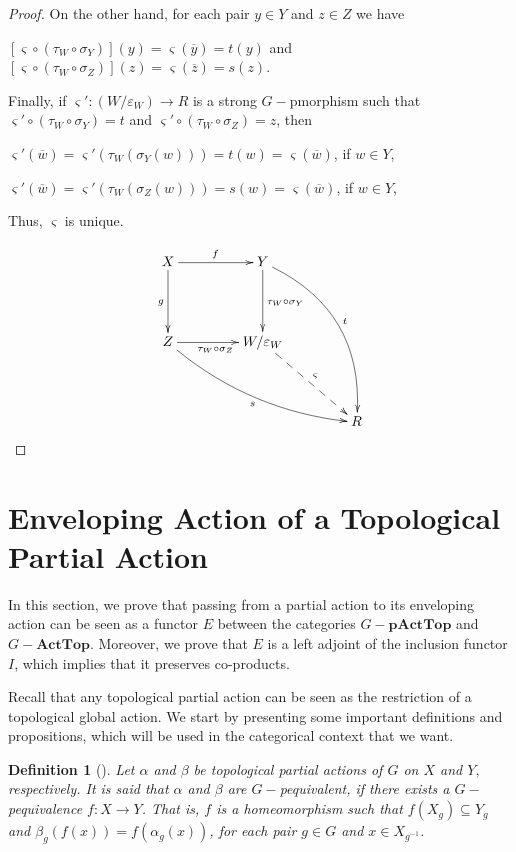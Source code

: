 \documentclass[sn-mathphys-num]{sn-jnl}%
\theoremstyle{thmstyleone}%
\theoremstyle{thmstyletwo}%
\theoremstyle{thmstylethree}%
\newtheorem{definition}{Definition}%
\begin{document}
\begin{proof}
On the other hand, for each pair $ y \in Y $ and $ z \in Z $ we have
\begin{center}
$[\varsigma\circ(\tau_W\circ \sigma_Y)](y)=\varsigma(\overline{y})=t(y)$ and $[\varsigma\circ(\tau_W\circ \sigma_Z)](z)=\varsigma(\overline{z})=s(z)$.
\end{center}
Finally, if $ \varsigma ':( W / \varepsilon_W) \to R $ is a strong $G-$pmorphism such that $\varsigma'\circ(\tau_W\circ \sigma_Y)=t$ and $\varsigma'\circ(\tau_W\circ \sigma_Z)=z$, then
\begin{center}
$\varsigma'(\overline{w})=\varsigma'(\tau_W(\sigma_Y(w)))=t(w)=\varsigma(\overline{w})$, if $w\in Y$,
\end{center}
\begin{center}
$\varsigma'(\overline{w})=\varsigma'(\tau_W(\sigma_Z(w)))=s(w)=\varsigma(\overline{w})$, if $w\in Y$,
\end{center}
Thus, $\varsigma$ is unique.


$$
\xymatrix@=1.5cm{
X \ar[r]^{f} \ar[d]_{g} & Y\ar[d]^{\tau_W\circ \sigma_Y} \ar@/_{-2pc}/[rdd]^{t} &\\
Z\ar[r]_{\tau_W\circ \sigma_Z}  \ar@/_1pc/[drr]_{s}   & W/\varepsilon_W\ar@{-->}[rd]^{\varsigma}&\\
  &   &R
  }
$$
\end{proof}



\section[Enveloping Action of a Topological Partial Action]{Enveloping Action of a Topological Partial  Action}

In this section, we prove that passing from a partial action to its enveloping action can be seen as a functor $E$ between the categories $G-\mathbf{pActTop}$ and $G-\mathbf{ActTop}$.
Moreover, we prove that $E$ is a left adjoint of the inclusion functor $I$, which implies that it preserves co-products.

\vspace{0.4cm}

Recall that any topological partial action can be seen as the restriction of a topological global action.
We start by presenting some important definitions and propositions, which will be used in the categorical context that we want.\\

\begin{definition}[\cite{Abadie2}]
Let $\alpha $ and $\beta$ be topological partial actions of $ G $ on $ X $ and $ Y,$ respectively. It is said that $ \alpha $ and $ \beta $ are $G-$pequivalent, if there exists a $G-$pequivalence $f:X\to Y$. That is, $f$ is a homeomorphism such that $f(X_g)\subseteq Y_g$ and $\beta_g(f(x))=f(\alpha_g(x))$, for each  pair $g\in G$ and $x\in X_{g^{-1}}$.\\
\end{definition}
\end{document}
